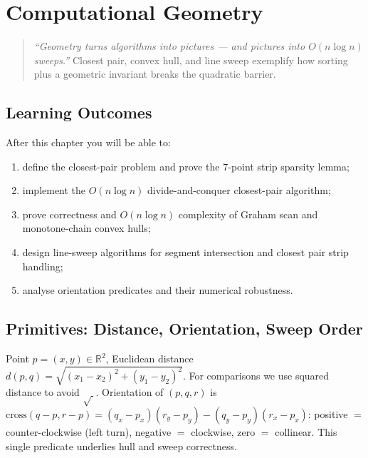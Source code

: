 \chapter{Computational Geometry}
\label{ch:geometry}

\begin{quote}
\emph{``Geometry turns algorithms into pictures --- and pictures into $O(n\log n)$ sweeps.''}
Closest pair, convex hull, and line sweep exemplify how sorting plus a geometric invariant breaks the quadratic barrier.
\end{quote}

\noindent{}
\vspace{0.4em}

\section*{Learning Outcomes}
After this chapter you will be able to:
\begin{enumerate}[label=(L\arabic*)]
    \item define the closest-pair problem and prove the $7$-point strip sparsity lemma;
    \item implement the $O(n\log n)$ divide-and-conquer closest-pair algorithm;
    \item prove correctness and $O(n\log n)$ complexity of Graham scan and monotone-chain convex hulls;
    \item design line-sweep algorithms for segment intersection and closest pair strip handling;
    \item analyse orientation predicates and their numerical robustness.
\end{enumerate}

\section{Primitives: Distance, Orientation, Sweep Order}
\label{sec:primitives}

Point $p=(x,y)\in\mathbb{R}^2$, Euclidean distance $d(p,q)=\sqrt{(x_1-x_2)^2+(y_1-y_2)^2}$. For comparisons we use squared distance to avoid $\sqrt{\ }$. Orientation of $(p,q,r)$ is $\text{cross}(q-p,r-p)=(q_x-p_x)(r_y-p_y)-(q_y-p_y)(r_x-p_x)$: positive $=$ counter-clockwise (left turn), negative $=$ clockwise, zero $=$ collinear. This single predicate underlies hull and sweep correctness.

